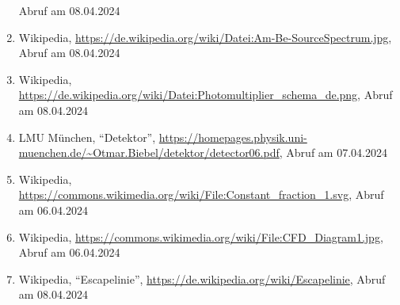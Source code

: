 \documentclass[12pt,a4paper]{scrartcl}
\numberwithin{equation}{section} %
\begin{document}
\begin{enumerate}
  Abruf am 08.04.2024
\item
  Wikipedia,
  \url{https://de.wikipedia.org/wiki/Datei:Am-Be-SourceSpectrum.jpg},
  Abruf am 08.04.2024
\item
  Wikipedia,
  \url{https://de.wikipedia.org/wiki/Datei:Photomultiplier_schema_de.png},
  Abruf am 08.04.2024
\item
  LMU München, ``Detektor'',
  \url{https://homepages.physik.uni-muenchen.de/~Otmar.Biebel/detektor/detector06.pdf},
  Abruf am 07.04.2024
\item
  Wikipedia,
  \url{https://commons.wikimedia.org/wiki/File:Constant_fraction_1.svg},
  Abruf am 06.04.2024
\item
  Wikipedia,
  \url{https://commons.wikimedia.org/wiki/File:CFD_Diagram1.jpg},
  Abruf am 06.04.2024
\item
  Wikipedia, ``Escapelinie'',
  \url{https://de.wikipedia.org/wiki/Escapelinie},
  Abruf am 08.04.2024
\end{enumerate}
\end{document}
